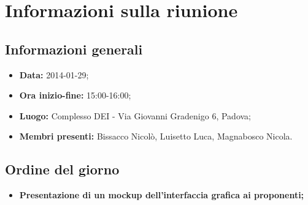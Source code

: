 \section{Informazioni sulla riunione}
\label{inforiunione}
\subsection{Informazioni generali}
\label{infogenerali}
\begin{itemize}
\item\textbf{Data:} 2014-01-29;
\item\textbf{Ora inizio-fine:} 15:00-16:00;
\item\textbf{Luogo:} Complesso DEI - Via Giovanni Gradenigo 6, Padova;
\item\textbf{Membri presenti:} Bissacco Nicolò, Luisetto Luca, Magnabosco Nicola.
\end{itemize}

\subsection{Ordine del giorno}
\label{odg}
\begin{itemize}
\item\textbf{Presentazione di un mockup dell'interfaccia grafica ai proponenti;}
\end{itemize}
